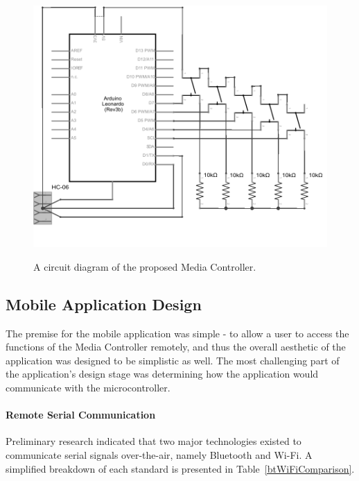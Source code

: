 \documentclass{article}
\begin{document}
			\begin{figure}[h]
				\centering
				{\includegraphics{mediaController_schem}}
				\caption{A circuit diagram of the proposed Media Controller.}
				\label{circ}
			\end{figure}
				
		\subsection{Mobile Application Design}
			The premise for the mobile application was simple - to allow a user to access the functions of the Media Controller remotely, and thus the overall aesthetic of the application was designed to be simplistic as well. The most challenging part of the application's design stage was determining how the application would communicate with the microcontroller.
			
			\paragraph{Remote Serial Communication}
			Preliminary research indicated that two major technologies existed to communicate serial signals over-the-air, namely Bluetooth and Wi-Fi. A simplified breakdown of each standard is presented in Table~\ref{btWiFiComparison}.
			
\end{document}
